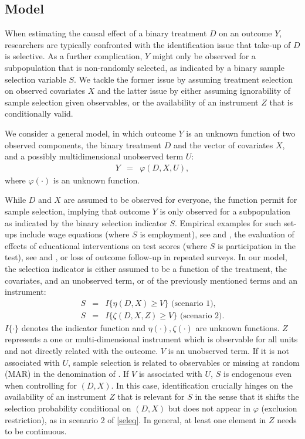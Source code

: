 \documentclass[nojss]{jss}
\begin{document}
\subsection{Model}

When estimating the causal effect of a binary treatment $D$ on an outcome $Y$, researchers are typically confronted with the identification issue that take-up of $D$ is selective. As a further complication, $Y$ might only be observed for a subpopulation that is non-randomly selected, as indicated by a binary sample selection variable $S$. We tackle the former issue by assuming treatment selection on observed covariates $X$ and the latter issue by either assuming ignorability of sample selection given observables, or the availability of an instrument $Z$ that is conditionally valid.

We consider a general model, in which outcome $Y$ is an unknown function of two observed components, the binary treatment $D$ and the vector of covariates $X$, and a possibly multidimensional unobserved term $U$:
\begin{eqnarray}\label{outeq}
Y&=&\varphi (D,X,U),
\end{eqnarray}
where $\varphi(\cdot)$ is an unknown function.

While $D$ and $X$ are assumed to be observed for everyone,  the  function permit for sample selection, implying that outcome $Y$ is only observed for a subpopulation as indicated by the binary selection indicator $S$. Empirical examples for such set-ups include wage equations (where $S$ is employment), see \citet{Gr74} and \citet{He76,Heck74}, the evaluation of effects of educational interventions on test scores (where $S$ is participation in the test), see \citet{AnBeKr04} and \citet{AnLaOr09}, or loss of outcome follow-up in repeated surveys. In our model, the selection indicator is either assumed to be a function of the treatment, the covariates, and an unobserved term, or of the previously mentioned terms and an instrument:
\begin{eqnarray}\label{seleq}
S&=&I\{\eta (D,X)\geq V\}\text{ (scenario 1),}\\
S&=&I\{\zeta (D,X,Z)\geq V\}\text{ (scenario 2).}
\end{eqnarray}
$I\{\cdot \}$ denotes the indicator function and $\eta(\cdot),\zeta(\cdot)$ are unknown functions. $Z$ represents a one or multi-dimensional instrument which is observable for all units and not directly related with the outcome. $V$ is an unobserved term. If it is not associated with $U$, sample selection is related to observables or missing at random (MAR) in the denomination of \citet{Ru76b}. If $V$ is associated with $U$, $S$ is endogenous even when controlling for $(D,X)$. In this case, identification crucially hinges on the availability of an instrument $Z$ that is relevant for $S$ in the sense that it shifts the selection probability conditional on $(D,X)$ but does not appear in $\varphi$ (exclusion restriction), as in scenario 2 of \eqref{seleq}. In general, at least one element in $Z$ needs to be continuous.
\end{document}
